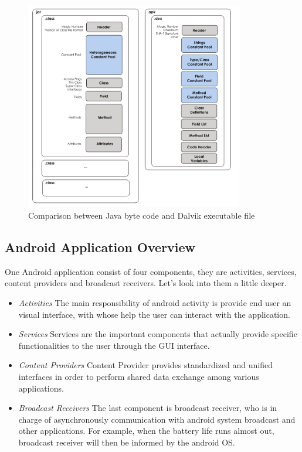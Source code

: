  \begin{figure}[!htbp]
	\centering
	\includegraphics[width=0.85\textwidth]{clas-vs-dex.jpg}
		\caption{Comparison between Java byte code and Dalvik executable file\cite{android_vm}}
	\label{fig:class-vs-dex}
\end{figure}

\subsection{Android Application Overview} \label{secAppComponents}
One Android application consist of four components, they are activities, services, content providers and broadcast receivers\cite{android_secure_design}. Let's look into them a little deeper.
\begin{itemize}
\item  \emph{Activities} The main responsibility of android activity is provide end user an visual interface, with whose help the user can interact with the application.  
\item  \emph{Services} Services are the important components that actually provide specific functionalities to the user through the  GUI interface.
\item  \emph{Content Providers} Content Provider provides standardized and unified interfaces in order to perform shared data exchange among various applications.
\item  \emph{Broadcast Receivers} The last component is broadcast receiver, who is in charge of  asynchronously communication with android system broadcast and other applications. For example, when the battery life runs almost out, broadcast receiver will then be informed by the android OS.
\end{itemize}

